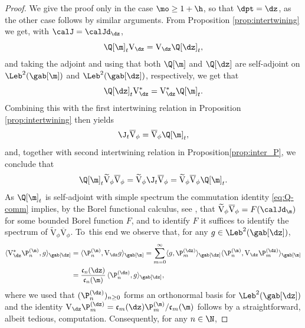 \begin{proof}
We give the proof only in the case $\mo \geq 1+\h$, so that $\dpt = \dz$, as the other case follows by similar arguments. From Proposition \ref{prop:intertwining} we get, with $\calJ = \calJd_{\dz}$,
\begin{equation*}
\Q[\m]_t \mathrm{V}_{\dz} = \mathrm{V}_{\dz} \Q[\dz]_t,
\end{equation*}
and taking the adjoint and using that both $\Q[\m]$ and $\Q[\dz]$ are self-adjoint on $\Leb^2(\gab[\m])$ and $\Leb^2(\gab[\dz])$, respectively, we get that
\begin{equation*}
\Q[\dz]_t \mathrm{V}_{\dz}^* = \mathrm{V}_{\dz}^* \Q[\m]_t.
\end{equation*}
Combining this with the first intertwining relation in Proposition \ref{prop:intertwining} then yields
\begin{equation*}
\J_t \overline{\mathrm{V}}_{\phi} = \overline{\mathrm{V}}_{\phi} \Q[\m]_t,
\end{equation*}
and, together with second intertwining relation in Proposition\ref{prop:inter_P}, we conclude that
\begin{equation}
\label{eq:Q-comm}
\Q[\m]_t \widetilde{\mathrm{V}}_{\phi}\overline{\mathrm{V}}_{\phi} = \widetilde{\mathrm{V}}_{\phi} \J_t \overline{\mathrm{V}}_{\phi} = \widetilde{\mathrm{V}}_{\phi}\overline{\mathrm{V}}_{\phi} \Q[\m]_t.
\end{equation}
As $\Q[\m]_t$ is self-adjoint with simple spectrum the commutation identity \eqref{eq:Q-comm} implies, by the Borel functional calculus, see \eg \cite{Rudin1973}, that $\widetilde{\mathrm{V}}_{\phi}\overline{\mathrm{V}}_{\phi} = F(\calJd_{\m})$ for some bounded Borel function $F$, and to identify $F$ it suffices to identify the spectrum of $\widetilde{\mathrm{V}}_{\phi}\overline{\mathrm{V}}_{\phi}$. To~this end we observe that, for any $g \in \Leb^2(\gab[\dz])$,
\begin{align*}
\langle \mathrm{V}_{\dz}^* \P_n^{(\m)}, g \rangle_{\gab[\dz]} &= \langle \P_n^{(\m)}, \mathrm{V}_{\dz} g \rangle_{\gab[\m]} = \sum_{m=0}^\infty \langle g, \P_m^{(\dz)} \rangle_{\gab[\dz]} \langle \P_n^{(\m)}, \mathrm{V}_{\dz} \P_m^{(\dz)} \rangle_{\gab[\m]} \\ & = \frac{\mathfrak{c}_n(\dz)}{\mathfrak{c}_n(\m)}\, \langle \P_n^{(\dz)},g \rangle_{\gab[\dz]},
\end{align*}
where we used that $(\P_n^{(\dz)})_{n \geq 0}$ forms an orthonormal basis for $\Leb^2(\gab[\dz])$ and the identity $\mathrm{V}_{\dz} \P_m^{(\dz)} = {\mathfrak{c}_m(\dz)} \P_m^{(\m)} / {\mathfrak{c}_m(\m)}$ follows by a straightforward, albeit tedious, computation. Consequently, for any $n \in \N$,

\end{proof}

